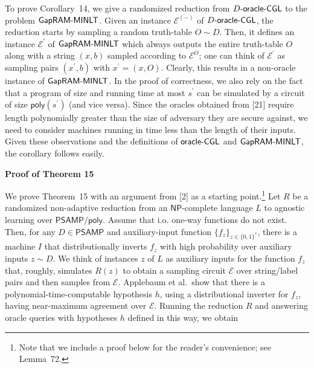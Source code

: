 \documentclass[10pt,a4paper]{article}
\begin{document}
To prove Corollary 14, we give a randomized reduction from $D\text{-}{\sf oracle}\text{-}{\sf CGL}$ to the problem ${\sf Gap}{\sf RAM}\text{-}{\sf MINLT}$. Given an instance $\mathcal{E}^{(-)}$ of $D\text{-}{\sf oracle}\text{-}{\sf CGL}$, the reduction starts by sampling a random truth-table $O\sim D$. Then, it defines an instance $\mathcal{E}^{\prime}$ of ${\sf Gap}{\sf RAM}\text{-}{\sf MINLT}$ which always outputs the entire truth-table $O$ along with a string $(x,b)$ sampled according to $\mathcal{E}^{O}$; one can think of $\mathcal{E}^{\prime}$ as sampling pairs $(x^{\prime},b)$ with $x^{\prime}=(x,O)$. Clearly, this results in a non-oracle instance of ${\sf Gap}{\sf RAM}\text{-}{\sf MINLT}$. In the proof of correctness, we also rely on the fact that a program of size and running time at most $s^{\prime}$ can be simulated by a circuit of size ${\mathsf{poly}}(s^{\prime})$ (and vice versa). Since the oracles obtained from [21] require length polynomially greater than the size of adversary they are secure against, we need to consider machines running in time less than the length of their inputs. Given these observations and the definitions of ${\sf oracle}\text{-}{\sf CGL}$ and ${\sf Gap}{\sf RAM}\text{-}{\sf MINLT}$, the corollary follows easily.\par





\par\medskip\noindent\textbf{Proof of Theorem 15
}\par




We prove Theorem 15 with an argument from [2] as a starting point.\footnote{Note that we include a proof below for the reader’s convenience; see Lemma 72.} Let $R$ be a randomized non-adaptive reduction from an ${\mathsf{NP}}$-complete language $L$ to agnostic learning over ${\mathsf{P}}{\mathsf{SAMP}}/{\mathsf{poly}}$. Assume that i.o. one-way functions do not exist. Then, for any $D\in{\mathsf{P}}{\mathsf{SAMP}}$ and auxiliary-input function $\{f_{z}\}_{z\in\{0,1\}^{*}}$, there is a machine $I$ that distributionally inverts $f_{z}$ with high probability over auxiliary inputs $z\sim D$. We think of instances $z$ of $L$ as auxiliary inputs for the function $f_{z}$ that, roughly, simulates $R(z)$ to obtain a sampling circuit $\mathcal{E}$ over string/label pairs and then samples from $\mathcal{E}$. Applebaum et al. show that there is a polynomial-time-computable hypothesis $h$, using a distributional inverter for $f_{z}$, having near-maximum agreement over $\mathcal{E}$. Running the reduction $R$ and answering oracle queries with hypotheses $h$ defined in this way, we obtain\par
\end{document}
